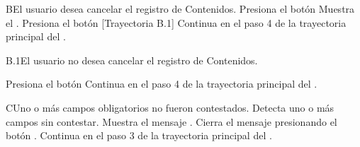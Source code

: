 \begin{UCtrayectoriaA}{B}{El usuario desea cancelar el registro de Contenidos.}
    \UCpaso[\UCactor] Presiona el botón 
    \UCpaso Muestra el .
    \UCpaso[\UCactor] Presiona el botón  [Trayectoria B.1]
    \UCpaso Continua en el paso 4 de la trayectoria principal del .

\end{UCtrayectoriaA}

\begin{UCtrayectoriaA}{B.1}{El usuario no desea cancelar el registro de Contenidos.}

    \UCpaso[\UCactor] Presiona el botón 
    \UCpaso Continua en el paso 4 de la trayectoria principal del .

\end{UCtrayectoriaA}


\begin{UCtrayectoriaA}{C}{Uno o más campos obligatorios no fueron contestados.}
  \UCpaso Detecta uno o más campos sin contestar.
    \UCpaso Muestra el mensaje .
    \UCpaso[\UCactor] Cierra el mensaje presionando el botón .
    \UCpaso Continua en el paso 3 de la trayectoria principal del .
\end{UCtrayectoriaA}
